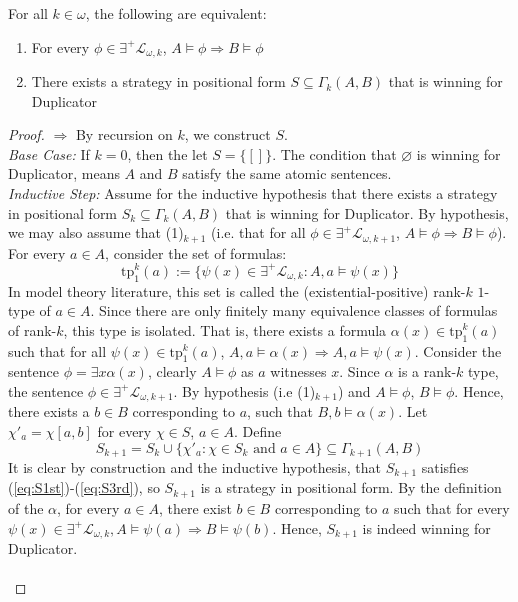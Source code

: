 \begin{prop}
For all $k \in \omega$, the following are equivalent:
\begin{enumerate}[label=(\arabic*)$_{k}$]
\item For every $\phi \in \exists^{+}\mathcal{L}_{\omega,k}$, $A \vDash \phi \Rightarrow B \vDash \phi$
\item There exists a strategy in positional form $S \subseteq \Gamma_{k}(A,B)$ that is winning for Duplicator 
\end{enumerate}
\begin{proof}
$\Rightarrow$ By recursion on $k$, we construct $S$. \\
\textit{Base Case:} If $k = 0$, then the let $S = \{[]\}$. The condition that $\varnothing$ is winning for Duplicator, means $A$ and $B$ satisfy the same atomic sentences. \\
\textit{Inductive Step:} Assume for the inductive hypothesis that there exists a strategy in positional form $S_{k} \subseteq \Gamma_{k}(A,B)$ that is winning for Duplicator. By hypothesis, we may also assume that (1)$_{k+1}$ (i.e. that for all $\phi \in \exists^{+}\mathcal{L}_{\omega,k+1}$, $A \vDash \phi \Rightarrow B \vDash \phi$). For every $a \in A$, consider the set of formulas: 
$$\text{tp}^{k}_{1}(a) := \{\psi(x) \in \exists^{+}\mathcal{L}_{\omega,k}: A,a \vDash\psi(x) \} $$ 
In model theory literature, this set is called the (existential-positive) rank-$k$ $1$-type of $a \in A$. Since there are only finitely many equivalence classes of formulas of rank-$k$, this type is isolated. That is, there exists a formula $\alpha(x) \in \text{tp}^{k}_{1}(a)$ such that for all $\psi(x) \in \text{tp}^{k}_{1}(a)$, $A,a \vDash \alpha(x) \Rightarrow A,a \vDash \psi(x)$. Consider the sentence $\phi = \exists x \alpha(x)$, clearly $A \vDash \phi$ as $a$ witnesses $x$. Since $\alpha$ is a rank-$k$ type, the sentence $\phi \in \exists^{+}\mathcal{L}_{\omega,k+1}$. By hypothesis (i.e (1)$_{k+1}$) and $A \vDash \phi$, $B \vDash \phi$. Hence, there exists a $b \in B$ corresponding to $a$, such that $B,b \vDash \alpha(x)$.  Let $\chi'_{a} = \chi[a,b]$ for every $\chi \in S$, $a \in A$.  Define
$$S_{k+1} =  S_{k} \cup \{\chi'_{a} : \chi \in S_{k} \text{ and }  a \in A \} \subseteq \Gamma_{k+1}(A,B)$$
It is clear by construction and the inductive hypothesis, that $S_{k+1}$ satisfies (\ref{eq:S1st})-(\ref{eq:S3rd}), so $S_{k+1}$ is a strategy in positional form. By the definition of the $\alpha$, for every $a \in A$, there exist $b \in B$ corresponding to $a$ such that for every $\psi(x) \in \exists^{+}\mathcal{L}_{\omega,k}, A \vDash \psi(a) \Rightarrow B \vDash \psi(b)$. Hence, $S_{k+1}$ is indeed winning for Duplicator. \\~\\

\end{proof}
\end{prop}
